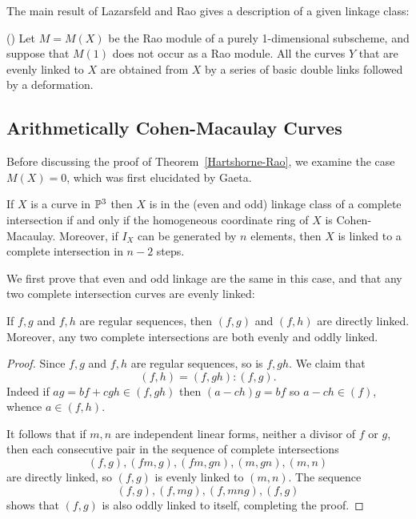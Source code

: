 
The main result of Lazarsfeld and Rao gives a description of a given linkage class:

\begin{theorem}(\cite{Lazarsfeld-Rao})\label{description of a linkage class}
Let $M= M(X)$ be the Rao module of a purely 1-dimensional subscheme, and suppose that $M(1)$ does not occur as a Rao module. All the curves $Y$ that are evenly linked to $X$ are obtained from $X$ by a series of basic double links followed by a deformation.
\end{theorem}

\subsection{Arithmetically Cohen-Macaulay Curves}

Before discussing the proof of Theorem~\ref{Hartshorne-Rao}, we examine the case $M(X) = 0$, which was first elucidated by Gaeta. 

\begin{theorem}\label{Gaeta}
If $X$ is a curve in $\PP^3$  then $X$ is in the (even and odd) linkage class of a complete intersection if and only if the homogeneous
coordinate ring of $X$ is Cohen-Macaulay. Moreover, if $I_X$ can be generated by $n$ elements, then $X$ is linked to
a complete intersection in $n-2$ steps.
\end{theorem}

We first prove that even and odd linkage are the same in this case, and that any two complete intersection curves
are evenly linked:

\begin{lemma}
If $f,g$ and $f,h$ are regular sequences, then $(f,g)$ and $(f,h)$ are directly linked. Moreover, 
any  two complete intersections are both evenly and oddly linked.
\end{lemma}
\begin{proof}
Since $f,g$ and $f,h$ are regular sequences, so is $f,gh$. We claim that
$$
(f,h) = (f,gh):(f,g).
$$
Indeed if $ag = bf+cgh\in (f,gh)$ then $(a-ch)g = bf$ so $a-ch \in (f)$, whence $a\in (f,h)$.

It follows that if $m,n$ are independent linear forms, neither a divisor of $f$ or $g$, then each consecutive pair
in the sequence of complete intersections
$$
(f,g), (fm,g), (fm,gn), (m,gn),(m,n)
$$
are directly linked, so $(f,g)$ is evenly linked to $(m,n)$. The sequence 
$$
(f,g),(f,mg), (f,mng), (f,g)
$$
shows that $(f,g)$ is also oddly linked to itself, completing the proof.
\end{proof}

